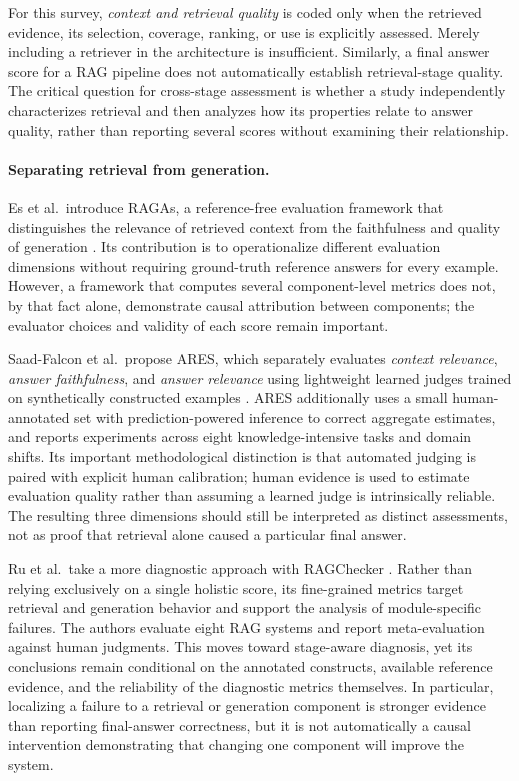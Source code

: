 For this survey, \emph{context and retrieval quality} is coded only when the retrieved evidence, its selection, coverage, ranking, or use is explicitly assessed. Merely including a retriever in the architecture is insufficient. Similarly, a final answer score for a RAG pipeline does not automatically establish retrieval-stage quality. The critical question for cross-stage assessment is whether a study independently characterizes retrieval and then analyzes how its properties relate to answer quality, rather than reporting several scores without examining their relationship.

\paragraph{Separating retrieval from generation.}
Es et al.\ introduce RAGAs, a reference-free evaluation framework that distinguishes the relevance of retrieved context from the faithfulness and quality of generation \cite{es2024ragas}. Its contribution is to operationalize different evaluation dimensions without requiring ground-truth reference answers for every example. However, a framework that computes several component-level metrics does not, by that fact alone, demonstrate causal attribution between components; the evaluator choices and validity of each score remain important.

Saad-Falcon et al.\ propose ARES, which separately evaluates \emph{context relevance}, \emph{answer faithfulness}, and \emph{answer relevance} using lightweight learned judges trained on synthetically constructed examples \cite{saadfalcon2024ares}. ARES additionally uses a small human-annotated set with prediction-powered inference to correct aggregate estimates, and reports experiments across eight knowledge-intensive tasks and domain shifts. Its important methodological distinction is that automated judging is paired with explicit human calibration; human evidence is used to estimate evaluation quality rather than assuming a learned judge is intrinsically reliable. The resulting three dimensions should still be interpreted as distinct assessments, not as proof that retrieval alone caused a particular final answer.

Ru et al.\ take a more diagnostic approach with RAGChecker \cite{ru2024ragchecker}. Rather than relying exclusively on a single holistic score, its fine-grained metrics target retrieval and generation behavior and support the analysis of module-specific failures. The authors evaluate eight RAG systems and report meta-evaluation against human judgments. This moves toward stage-aware diagnosis, yet its conclusions remain conditional on the annotated constructs, available reference evidence, and the reliability of the diagnostic metrics themselves. In particular, localizing a failure to a retrieval or generation component is stronger evidence than reporting final-answer correctness, but it is not automatically a causal intervention demonstrating that changing one component will improve the system.

